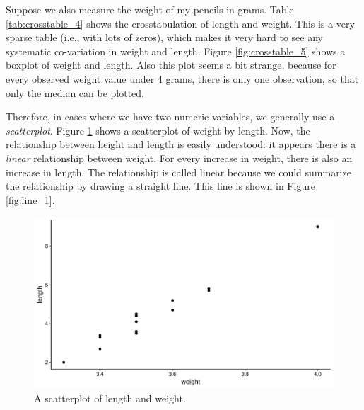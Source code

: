 \documentclass[]{book}\usepackage[]{graphicx}\usepackage[]{color}
\makeatletter
\def\maxwidth{ %
  \ifdim\Gin@nat@width>\linewidth
    \linewidth
  \else
    \Gin@nat@width
  \fi
}
\makeatother
\begin{document}
Suppose we also measure the weight of my pencils in grams. Table \ref{tab:crosstable_4} shows the crosstabulation of length and weight. This is a very sparse table (i.e., with lots of zeros), which makes it very hard to see any systematic co-variation in weight and length. Figure \ref{fig:crosstable_5} shows a boxplot of weight and length. Also this plot seems a bit strange, because for every observed weight value under 4 grams, there is only one observation, so that only the median can be plotted.

Therefore, in cases where we have two numeric variables, we generally use a \textit{scatterplot}. Figure \ref{fig:scatter_1} shows a scatterplot of weight by length. Now, the relationship between height and length is easily understood: it appears there is a \textit{linear} relationship between weight. For every increase in weight, there is also an increase in length. The relationship is called linear because we could summarize the relationship by drawing a straight line. This line is shown in Figure \ref{fig:line_1}.


\begin{figure}

{\centering \includegraphics[width=\maxwidth]{figure/scatter_1-1} 

}

\caption[A scatterplot of length and weight]{A scatterplot of length and weight.}\label{fig:scatter_1}
\end{figure}
\end{document}
